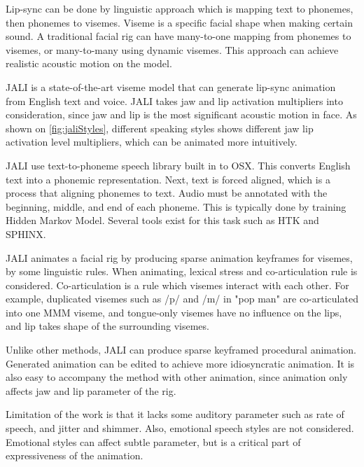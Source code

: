 \documentclass[10pt,twocolumn,letterpaper]{article}
\begin{document}
Lip-sync can be done by linguistic approach which is mapping text to phonemes, then phonemes to visemes\cite{ezzatMikeTalkTalkingFacial1998}. Viseme is a specific facial shape when making certain sound. A traditional facial rig can have many-to-one mapping from phonemes to visemes, or many-to-many using dynamic visemes. This approach can achieve realistic acoustic motion on the model.

JALI\cite{edwardsJALIAnimatorcentricViseme2016} is a state-of-the-art viseme model that can generate lip-sync animation from English text and voice. JALI takes jaw and lip activation multipliers into consideration, since jaw and lip is the most significant acoustic motion in face. As shown on \cref{fig:jaliStyles}, different speaking styles shows different jaw lip activation level multipliers, which can be animated more intuitively.

JALI use text-to-phoneme speech library built in to OSX. This converts English text into a phonemic representation. Next, text is forced aligned, which is a process that aligning phonemes to text. Audio must be annotated with the beginning, middle, and end of each phoneme. This is typically done by training Hidden Markov Model. Several tools exist for this task such as HTK and SPHINX.

JALI animates a facial rig by producing sparse animation keyframes for visemes, by some linguistic rules. When animating, lexical stress and co-articulation rule is considered. Co-articulation is a rule which visemes interact with each other. For example, duplicated visemes such as /p/ and /m/ in "pop man" are co-articulated into one MMM viseme, and tongue-only visemes have no influence on the lips, and lip takes shape of the surrounding visemes.


Unlike other methods, JALI can produce sparse keyframed procedural animation. Generated animation can be edited to achieve more idiosyncratic animation. It is also easy to accompany the method with other animation, since animation only affects jaw and lip parameter of the rig.

Limitation of the work is that it lacks some auditory parameter such as rate of speech, and jitter and shimmer. Also, emotional speech styles are not considered. Emotional styles can affect subtle parameter, but is a critical part of expressiveness of the animation.
\end{document}
